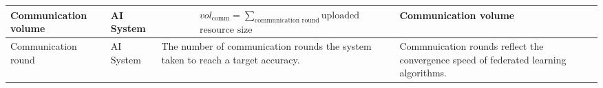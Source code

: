 \begin{table}[h]
\begin{tabular}{|p{3cm}|l|p{6cm}|p{3cm}|p{1.5cm}|}
Communication volume
& AI System
&
\parbox{3cm}{
    \begin{equation} \label{equ:cv}  
    \begin{split}
& vol_{\text{comm}} = 
 \sum_{\text{communication round}} 
\text{uploaded} \\
& \text{resource size}
    \end{split}
    \end{equation}
}
& 
Communication volume
& \cite{DBLP:conf/aistats/McMahanMRHA17}
\\ \hline

Communication round
& AI System
&
The number of communication rounds the system taken to reach a target accuracy. 
& 
Commnuication rounds reflect the convergence speed of federated learning algorithms.
& \cite{DBLP:conf/aistats/McMahanMRHA17}
\\ \hline

\end{tabular}
\end{table}

